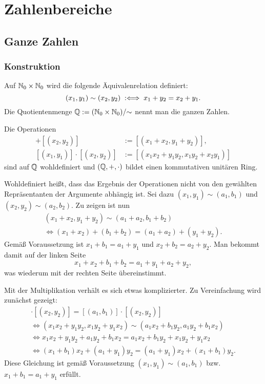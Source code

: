 
\chapter{Zahlenbereiche}

\section{Ganze Zahlen}

\subsection{Konstruktion}

\begin{Definition}
Auf $\mathbb N_0\times\mathbb N_0$ wird die folgende Äquivalenrelation definiert:
\[(x_1,y_1)\sim (x_2,y_2) \;:\Longleftrightarrow\; x_1+y_2 = x_2+y_1.\]
Die Quotientenmenge $\mathbb Q := (\mathbb N_0\times\mathbb N_0)/{\sim}$ nennt man
die ganzen Zahlen.
\end{Definition}

\begin{Satz}
Die Operationen
\begin{align*}
[(x_1,y_1)]+[(x_2,y_2)] &:= [(x_1+x_2,y_1+y_2)],\\
[(x_1,y_1)]\cdot [(x_2,y_2)] &:= [(x_1x_2+y_1y_2,x_1y_2+x_2y_1)]
\end{align*}
sind auf $\mathbb Q$ wohldefiniert und $(\mathbb Q,+,\cdot)$ bildet einen
kommutativen unitären Ring.
\end{Satz}
 Wohldefiniert heißt, dass das Ergebnis der Operationen
nicht von den gewählten Repräsentanten der Argumente abhängig ist.
Sei dazu $(x_1,y_1)\sim(a_1,b_1)$ und
$(x_2,y_2)\sim (a_2,b_2)$. Zu zeigen ist nun
\begin{gather*}
(x_1+x_2,y_1+y_2)\sim (a_1+a_2,b_1+b_2)\\
\iff (x_1+x_2)+(b_1+b_2) = (a_1+a_2)+(y_1+y_2).
\end{gather*}
Gemäß Voraussetzung ist $x_1+b_1=a_1+y_1$ und $x_2+b_2=a_2+y_2$.
Man bekommt damit auf der linken Seite
\[x_1+x_2+b_1+b_2 = a_1+y_1+a_2+y_2,\]
was wiederum mit der rechten Seite übereinstimmt.

Mit der Multiplikation verhält es sich etwas komplizierter.
Zu Vereinfachung wird zunächst gezeigt:
\begin{gather*}
[(x_1,y_1)]\cdot [(x_2,y_2)] = [(a_1,b_1)]\cdot [(x_2,y_2)]\\
\iff (x_1x_2+y_1y_2,x_1y_2+y_1x_2)\sim (a_1x_2+b_1y_2,a_1y_2+b_1x_2)\\
\iff x_1x_2+y_1y_2 + a_1y_2+b_1x_2 = a_1x_2+b_1y_2 + x_1y_2+y_1x_2\\
\iff (x_1+b_1)x_2 + (a_1+y_1)y_2 = (a_1+y_1)x_2 + (x_1+b_1)y_2.
\end{gather*}
Diese Gleichung ist gemäß Voraussetzung $(x_1,y_1)\sim (a_1,b_1)$
bzw. $x_1+b_1=a_1+y_1$ erfüllt.

